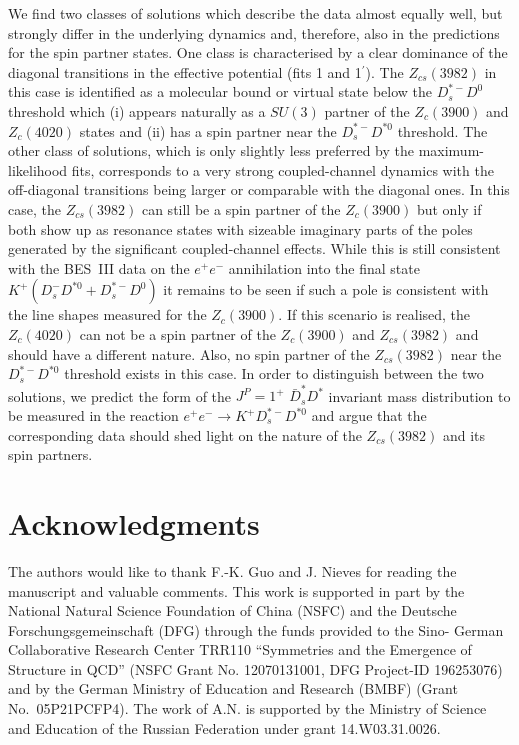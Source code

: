 \documentclass[preprint,12pt,3p]{elsarticle}
\begin{document}
We find two classes of solutions which describe the data almost equally well, but
strongly differ in the underlying dynamics and, therefore, also in the predictions for the spin partner states. One class is characterised by a clear dominance of the diagonal transitions in the effective potential (fits 1 and 1$^\prime$). The $Z_{cs}(3982)$ in this case is identified as a molecular bound or virtual state below the ${D}_s^{*-}D^0$ threshold which (i) appears naturally as a $SU(3)$ partner of the $Z_c(3900)$ and $Z_c(4020)$ states and (ii) has a spin partner near the $D_s^{*-}D^{*0}$ threshold. The other class of solutions, which is only slightly less preferred by the maximum-likelihood fits, corresponds to a very strong coupled-channel dynamics with the off-diagonal transitions being larger or comparable with the diagonal ones. In this case, the $Z_{cs}(3982)$ can still be a spin partner of the $Z_c(3900)$ but only if both show up as resonance states with sizeable imaginary parts of the poles generated by the significant coupled-channel effects. While this is still consistent with the BES~III data on the $e^+e^-$ annihilation into the final state $K^+(D_s^-D^{*0}+D_s^{*-}D^0)$ it remains to be seen if such a pole is consistent with the line shapes measured for the $Z_c(3900)$. If this scenario is realised, the $Z_c(4020)$ can not be a spin partner of the $Z_c(3900)$ and $Z_{cs}(3982)$ and should have a different nature. Also, no spin partner of the $Z_{cs}(3982)$ near the $D_s^{*-}D^{*0}$ threshold exists in this case. In order to distinguish between the two solutions, we predict the form of the $J^{P}=1^+$ $\bar{D}_s^*D^*$ invariant mass distribution to be measured in the reaction $e^+e^-\to K^+D_s^{*-}D^{*0}$ and argue that the corresponding data should shed light on the nature of the $Z_{cs}(3982)$ and its spin partners. 

\section*{Acknowledgments}

The authors would like to thank F.-K. Guo and J. Nieves for reading the manuscript and valuable comments.
This work is supported in part by the National Natural Science Foundation of China (NSFC) and the Deutsche Forschungsgemeinschaft (DFG) 
through the funds provided to the Sino- German Collaborative Research Center TRR110 ``Symmetries and the Emergence of Structure in QCD'' (NSFC Grant No. 12070131001, DFG Project-ID 196253076) and by the German Ministry of Education and Research (BMBF) (Grant No.~05P21PCFP4). 
The work of A.N. is supported by the Ministry of Science and Education of the Russian Federation under grant 14.W03.31.0026.
\end{document}

